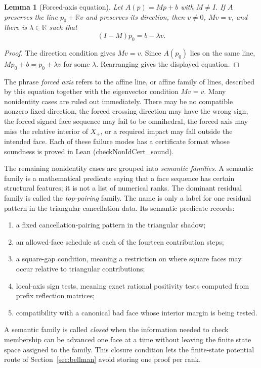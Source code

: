 \documentclass[11pt]{article}
\newtheorem{lemma}[theorem]{Lemma}
\newcommand{\R}{\mathbb{R}}
\newcommand{\leanref}[1]{{\small\ttfamily #1}}
\begin{document}
\begin{lemma}[Forced-axis equation]
Let \(A(p)=Mp+b\) with \(M\ne I\).  If \(A\) preserves the line
\(p_0+\R v\) and preserves its direction, then \(v\ne0\), \(Mv=v\), and there
is \(\lambda\in\R\) such that
\[
  (I-M)p_0=b-\lambda v.
\]
\end{lemma}

\begin{proof}
The direction condition gives \(Mv=v\).  Since \(A(p_0)\) lies on the same
line, \(Mp_0+b=p_0+\lambda v\) for some \(\lambda\).  Rearranging gives the
displayed equation.
\end{proof}

The phrase \emph{forced axis} refers to the affine line, or affine family of
lines, described by this equation together with the eigenvector condition
\(Mv=v\).  Many nonidentity cases are ruled out immediately.  There may be no
compatible nonzero fixed direction, the forced crossing direction may have
the wrong sign, the forced signed face sequence may fail to be omnihedral,
the forced axis may miss the relative interior of \(X_+\), or a required
impact may fall outside the intended face.  Each of these failure modes has a
certificate format whose soundness is proved in Lean
(\leanref{checkNonIdCert\_sound}).

The remaining nonidentity cases are grouped into \emph{semantic families}.  A
semantic family is a mathematical predicate saying that a face sequence has
certain structural features; it is not a list of numerical ranks.  The
dominant residual family is called the \emph{top-pairing} family.  The name is
only a label for one residual pattern in the triangular cancellation data.
Its semantic predicate records:
\begin{enumerate}[leftmargin=2em]
\item a fixed cancellation-pairing pattern in the triangular shadow;
\item an allowed-face schedule at each of the fourteen contribution steps;
\item a square-gap condition, meaning a restriction on where square faces may
  occur relative to triangular contributions;
\item local-axis sign tests, meaning exact rational positivity tests computed
  from prefix reflection matrices;
\item compatibility with a canonical bad face whose interior margin is being
  tested.
\end{enumerate}

A semantic family is called \emph{closed} when the information needed to
check membership can be advanced one face at a time without leaving the
finite state space assigned to the family.  This closure condition lets the
finite-state potential route of Section~\ref{sec:bellman} avoid storing one
proof per rank.
\end{document}
